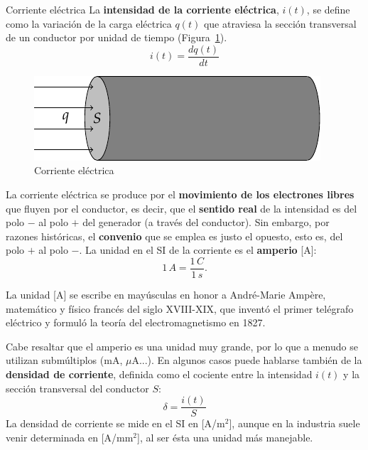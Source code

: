 \documentclass[11pt]{book} %
\makeatletter
\numberwithin{dummy}{section}
\theoremstyle{ocrenumbox}
\theoremstyle{blacknumex}
\theoremstyle{blacknumbox}
\theoremstyle{ocrenum}
\newenvironment{remark}{\par\vspace{10pt}\small %
\begin{list}{}{
\leftmargin=35pt %
\rightmargin=25pt}\item\ignorespaces %
\makebox[-2.5pt]{\begin{tikzpicture}[overlay]
\node[draw=ocre!60,line width=1pt,circle,fill=ocre!25,font=\sffamily\bfseries,inner sep=2pt,outer sep=0pt] at (-15pt,0pt){\textcolor{ocre}{N}};\end{tikzpicture}} %
\advance\baselineskip -1pt}{\end{list}\vskip5pt} %
\renewcommand{\subsubsection}{\@startsection {subsubsection}{3}{\z@}
{-2ex \@plus -0.1ex \@minus -.2ex}
{.2ex \@plus.2ex }
{\normalfont\small\sffamily\bfseries}}
\newlength\esp
\makeatother
\begin{document}
	\subsubsection{Corriente eléctrica}
	La \textbf{intensidad de la corriente eléctrica}, $i(t)$, se define como la variación de la carga eléctrica $q(t)$ que atraviesa la sección transversal de un conductor por unidad de tiempo (Figura~\ref{fig.seccion_conductor}). 
	\begin{equation*}\label{eq.intensidad}
		i(t)=\dfrac{dq(t)}{dt}
	\end{equation*}
	\begin{figure}[htbp]
		\centering
		\includegraphics[width=0.45\linewidth]{../figs/seccion_conductor.pdf}
		\caption{Corriente eléctrica}
		\label{fig.seccion_conductor}
	\end{figure}
	
	La corriente eléctrica se produce por el \textbf{movimiento de los electrones libres} que fluyen por el conductor, es decir, que el \textbf{sentido real} de la intensidad es del polo $-$ al polo $+$ del generador (a través del conductor). Sin embargo, por razones históricas, el \textbf{convenio} que se emplea es justo el opuesto, esto es, del polo $+$ al polo $-$. La unidad en el SI de la corriente es el \textbf{amperio} [A]: 
	\begin{equation*}
		1\,A =\dfrac{1\,C}{1\,s}.
	\end{equation*}
	\begin{remark}
		La unidad [A] se escribe en mayúsculas en honor a André-Marie Ampère, matemático y físico francés del siglo XVIII-XIX, que inventó el primer telégrafo eléctrico y formuló la teoría del electromagnetismo en 1827.
	\end{remark}
	
	Cabe resaltar que el amperio es una unidad muy grande, por lo que a menudo se utilizan submúltiplos (mA, $\mu$A...). En algunos casos puede hablarse también de la \textbf{densidad de corriente}, definida como el cociente entre la intensidad $i(t)$ y la sección transversal del conductor $S$:
	\begin{equation*}
		\delta =\dfrac{i(t)}{S}
	\end{equation*}
	La densidad de corriente se mide en el SI en [A/m$^2$], aunque en la industria suele venir determinada en [A/mm$^2$], al ser ésta una unidad más manejable.
	
\end{document}
